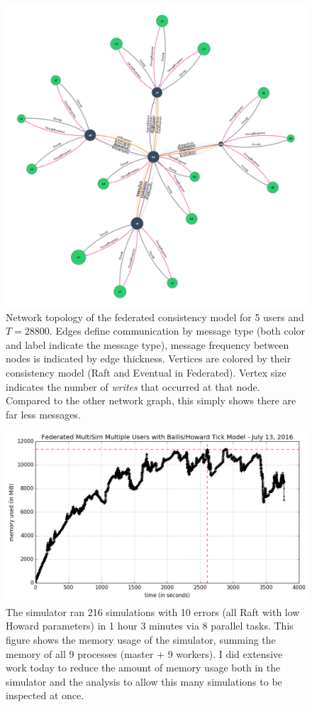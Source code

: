 \documentclass[10pt,letterpaper]{article}
\begin{document}
\begin{figure}[!h]
    \centering
        \includegraphics[width=\textwidth]{figures/federated-TNone.png}
        \caption{\textsf{Network topology of the federated consistency model for 5 users and $T=28800$. Edges define communication by message type (both color and label indicate the message type), message frequency between nodes is indicated by edge thickness. Vertices are colored by their consistency model (Raft and Eventual in Federated). Vertex size indicates the number of \textit{writes} that occurred at that node. Compared to the other network graph, this simply shows there are far less messages.}}
        \label{fig:topology}
\end{figure}

\begin{figure}[!h]
    \centering
        \includegraphics[width=\textwidth]{figures/memory_profiler.png}
        \caption{\textsf{The simulator ran 216 simulations with 10 errors (all Raft with low Howard parameters) in 1 hour 3 minutes via 8 parallel tasks. This figure shows the memory usage of the simulator, summing the memory of all 9 processes (master + 9 workers). I did extensive work today to reduce the amount of memory usage both in the simulator and the analysis to allow this many simulations to be inspected at once.}}
        \label{fig:memory_profiler}
\end{figure}
\end{document}
